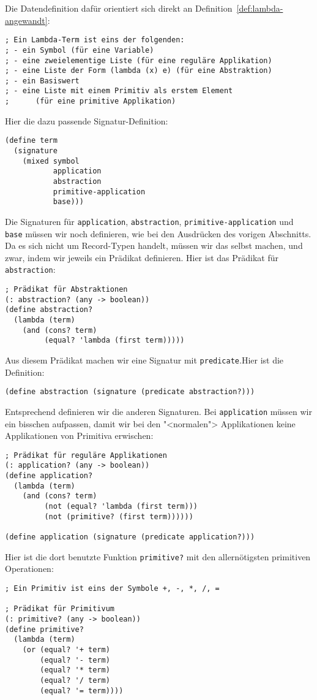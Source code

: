 Die Datendefinition dafür orientiert sich direkt an
Definition~\ref{def:lambda-angewandt}:
%
\begin{lstlisting}
; Ein Lambda-Term ist eins der folgenden:
; - ein Symbol (für eine Variable)
; - eine zweielementige Liste (für eine reguläre Applikation)
; - eine Liste der Form (lambda (x) e) (für eine Abstraktion)
; - ein Basiswert
; - eine Liste mit einem Primitiv als erstem Element
;      (für eine primitive Applikation)
\end{lstlisting}
%
Hier die dazu passende Signatur-Definition:
%
\begin{lstlisting}
(define term
  (signature
    (mixed symbol
           application
           abstraction
           primitive-application
           base)))
\end{lstlisting}
%
Die Signaturen für \lstinline{application}, \lstinline{abstraction},
\lstinline{primitive-application} und \lstinline{base} müssen wir noch
definieren, wie bei den Ausdrücken des vorigen Abschnitts.
Da es sich nicht um Record-Typen handelt, müssen wir das
selbst machen, und zwar, indem wir jeweils ein Prädikat definieren.
Hier ist das Prädikat für \lstinline{abstraction}:
%
\begin{lstlisting}
; Prädikat für Abstraktionen
(: abstraction? (any -> boolean))
(define abstraction?
  (lambda (term)
    (and (cons? term)
         (equal? 'lambda (first term)))))
\end{lstlisting}
%
Aus diesem Prädikat machen wir eine Signatur mit
\lstinline{predicate}.Hier ist die Definition:
%
\begin{lstlisting}
(define abstraction (signature (predicate abstraction?)))
\end{lstlisting}
%
%
Entsprechend definieren wir die anderen Signaturen.  Bei
\lstinline{application} müssen wir ein bisschen aufpassen, damit wir
bei den "<normalen"> Applikationen keine Applikationen von Primitiva
erwischen:
%
\begin{lstlisting}
; Prädikat für reguläre Applikationen
(: application? (any -> boolean))
(define application?
  (lambda (term)
    (and (cons? term)
         (not (equal? 'lambda (first term)))
         (not (primitive? (first term))))))

(define application (signature (predicate application?)))
\end{lstlisting}
%
Hier ist die dort benutzte Funktion \lstinline{primitive?} mit den
allernötigsten primitiven Operationen:\label{page:primitivep}
%
\begin{lstlisting}
; Ein Primitiv ist eins der Symbole +, -, *, /, =

; Prädikat für Primitivum
(: primitive? (any -> boolean))
(define primitive?
  (lambda (term)
    (or (equal? '+ term)
        (equal? '- term)
        (equal? '* term)
        (equal? '/ term)
        (equal? '= term))))
\end{lstlisting}
